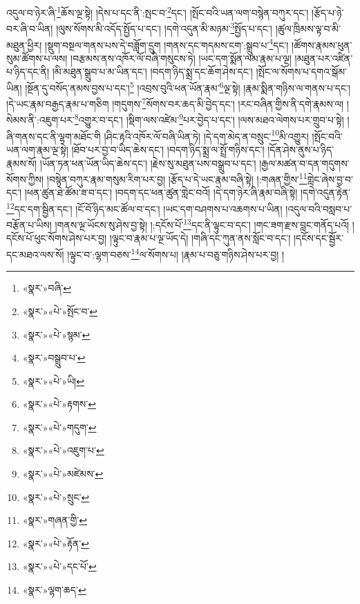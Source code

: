 འདུལ་བ་ཉེར་ཞི་\footnote{«སྣར་»བཞི་}ཆོས་ལྔ་སྟེ། །དེས་པ་དང་ནི་:སྤང་བ་\footnote{«སྣར་»«པེ་»སྤོང་བ་}དང་། །སྤོང་བའི་ཡན་ལག་བསྙེན་བཀུར་དང་། །རྩོད་པ་ཉེ་བར་ཞི་བ་ཡིན། །ལུས་སོགས་མི་འདོད་སྤྱོད་པ་དང་། །དགེ་འདུན་མི་མཉམ་\footnote{«སྣར་»«པེ་»སྙམ་}སྤྱོད་པ་དང་། །ཚུལ་ཁྲིམས་ལྟ་བ་མི་མཐུན་ཕྱིར། །སྡུག་བསྔལ་གནས་པས་དེ་བཟློག་དྲུག །གནས་དང་གདམས་ངག་:སྒྲུབ་པ་\footnote{«སྣར་»བསྒྲུབ་པ་}དང་། །ཚོགས་རྣམས་ཕུན་སུམ་ཚོགས་པ་ལས། །བརྩམས་ནས་འཁོར་ལོ་བཞི་གསུངས་ཏེ། །ཡང་དག་སྨོན་ལམ་རྣམ་པ་ལྔ། །མཐུན་པར་འཛིན་པ་ཉིད་དང་ནི། །མི་མཐུན་སྒྲུབ་པ་མ་ཡིན་དང་། །བདག་ཉིད་སྨྲ་དང་ཆོག་ཤེས་དང་། །སྤོང་ལ་སོགས་པ་དགའ་སྒོམ་ཡིན། །སྔོན་དུ་བསོད་ནམས་བྱས་པ་དང་།\footnote{«སྣར་»«པེ་»ཡི།} །འབྲས་བུའི་ཕན་ཡོན་རྣམ་\footnote{«སྣར་»«པེ་»རྟགས་}ལྔ་སྟེ། །རྣམ་སྨིན་གཉིས་ལ་གནས་པ་དང་། །དེ་ཡང་རྣམ་བརྒྱད་རྣམ་པ་གཅིག །གདུགས་\footnote{«སྣར་»«པེ་»གདུག་}སོགས་བར་ཆད་མི་བྱེད་དང་། །རང་བཞིན་གྱིས་ནི་དགེ་རྣམས་ལ། །སེམས་ནི་:འཇུག་པར་\footnote{«སྣར་»«པེ་»འཇུག་པ་}འགྱུར་བ་དང་། །སྡིག་ལས་འཛེམ་\footnote{«སྣར་»«པེ་»མཛེམས་}པར་བྱེད་པ་དང་། །ལས་མཐའ་ལེགས་པར་གྲུབ་པ་སྟེ། །ཞི་གནས་དང་ནི་ལྷག་མཐོང་གི །ཤིང་རྟའི་འཁོར་ལོ་བཞི་ཡིན་ཏེ། །དེ་དག་མེད་ན་བསྲུང་\footnote{«སྣར་»«པེ་»སྲུང་}མི་འགྱུར། །སྤོང་བའི་ཡན་ལག་རྣམ་ལྔ་སྟེ། །ཐོབ་པར་བྱ་བ་ཡིད་ཆེས་དང་། །བདག་ཉིད་སྨྲ་ལ་སྤྲོ་གཉིས་དང་། །དོན་ཤེས་ནུས་པ་ཉིད་རྣམས་སོ། །ཡོན་ཏན་ཕན་ཡོན་ཡིད་ཆེས་དང་། །རྗེས་སུ་མཐུན་པས་བསྒྲུབ་པ་དང་། །རྒྱལ་མཚན་བ་དན་གདུགས་སོགས་ཀྱིས། །བསྙེན་བཀུར་རྣམ་གསུམ་རིག་པར་བྱ། །རྩོད་པ་དེ་ཡང་རྣམ་བཞི་སྟེ། །:གཞན་གྱིས་\footnote{«སྣར་»གཞན་གྱི་}གླེང་ཞེས་བྱ་བ་དང་། །ཕན་ཚུན་ཐེ་ཚོམ་ཟ་བ་དང་། །བདག་དང་ཕན་ཚུན་གླེང་བའོ། །དེ་དག་ཉེར་ཞི་རྣམ་བཞི་སྟེ། །དགེ་འདུན་རྟེན་\footnote{«སྣར་»«པེ་»རྟོན་}དང་དག་སྦྱིན་དང་། །ངོ་བོ་ཉིད་མང་ཚོལ་བ་དང་། །ཡང་དག་བཤགས་པ་འཆགས་པ་ཡིན། །འདུལ་བའི་བསླབ་པ་བརྩོན་པ་ཡིས། །གནས་ལྔ་ཡོངས་སུ་ཤེས་བྱ་སྟེ། །:དངོས་པོ་\footnote{«སྣར་»«པེ་»དང་པོ་}དང་ནི་ལྟུང་བ་དང་། །གང་ཟག་རྫས་བླང་གནོད་པའོ། །དངོས་པོ་ཕུང་སོགས་ཤེས་པར་བྱ། །ལྟུང་བ་རྣམ་པ་ལྔ་ཡོད་དེ། །གཞི་དང་ཀུན་ནས་སློང་བ་དང་། །དངོས་དང་སྦྱོར་དང་མཐའ་ལས་སོ། །ལྟུང་བ་:ལྷག་བཅས་\footnote{«སྣར་»ལྷག་ཆད་}ལ་སོགས་པ། །རྣམ་པ་བཅུ་གཉིས་ཤེས་པར་བྱ། །
